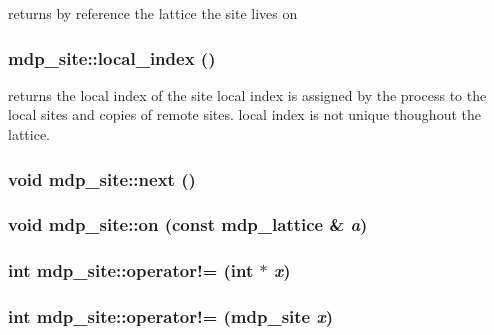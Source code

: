 returns by reference the lattice the site lives on \hypertarget{classmdp__site_a4a19d418044e9bf5e285998676df6f43}{
\subsubsection[{local\_\-index}]{ mdp\_\-site::local\_\-index ()}}
\label{classmdp__site_a4a19d418044e9bf5e285998676df6f43}
returns the local index of the site local index is assigned by the process to the local sites and copies of remote sites. local index is not unique thoughout the lattice. \hypertarget{classmdp__site_a19445777d77aaf38ff3bd15d48c7c683}{
\subsubsection[{next}]{\setlength{\rightskip}{0pt plus 5cm}void mdp\_\-site::next ()}}
\label{classmdp__site_a19445777d77aaf38ff3bd15d48c7c683}
\hypertarget{classmdp__site_a6342ca7fb3edaef8b09854ca98399fa4}{
\subsubsection[{on}]{\setlength{\rightskip}{0pt plus 5cm}void mdp\_\-site::on (const {\bf mdp\_\-lattice} \& {\em a})}}
\label{classmdp__site_a6342ca7fb3edaef8b09854ca98399fa4}
\hypertarget{classmdp__site_a424ed9f2670e12a0a3fe521070fc5d41}{
\subsubsection[{operator!=}]{\setlength{\rightskip}{0pt plus 5cm}int mdp\_\-site::operator!= (int $\ast$ {\em x})}}
\label{classmdp__site_a424ed9f2670e12a0a3fe521070fc5d41}
\hypertarget{classmdp__site_af393fef955cb91629ece72746a582236}{
\subsubsection[{operator!=}]{\setlength{\rightskip}{0pt plus 5cm}int mdp\_\-site::operator!= ({\bf mdp\_\-site} {\em x})}}
